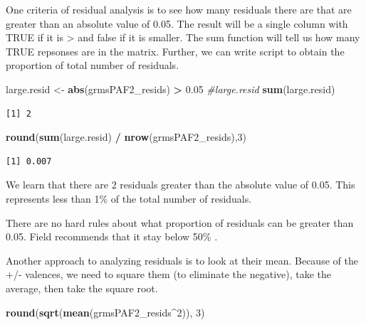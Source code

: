 \documentclass[
  english,
]{book}
\newenvironment{Shaded}{\begin{snugshade}}{\end{snugshade}}
\newcommand{\CommentTok}[1]{\textcolor[rgb]{0.56,0.35,0.01}{\textit{#1}}}
\newcommand{\DecValTok}[1]{\textcolor[rgb]{0.00,0.00,0.81}{#1}}
\newcommand{\FloatTok}[1]{\textcolor[rgb]{0.00,0.00,0.81}{#1}}
\newcommand{\KeywordTok}[1]{\textcolor[rgb]{0.13,0.29,0.53}{\textbf{#1}}}
\newcommand{\NormalTok}[1]{#1}
\newcommand{\OperatorTok}[1]{\textcolor[rgb]{0.81,0.36,0.00}{\textbf{#1}}}
\newcommand{\StringTok}[1]{\textcolor[rgb]{0.31,0.60,0.02}{#1}}
\begin{document}
One criteria of residual analysis is to see how many residuals there are that are greater than an absolute value of 0.05. The result will be a single column with TRUE if it is \textgreater{} \textbar{} and false if it is smaller. The sum function will tell us how many TRUE repsonses are in the matrix. Further, we can write script to obtain the proportion of total number of residuals.

\begin{Shaded}
\begin{Highlighting}[]
\NormalTok{large.resid <-}\StringTok{ }\KeywordTok{abs}\NormalTok{(grmsPAF2_resids) }\OperatorTok{>}\StringTok{ }\FloatTok{0.05}
\CommentTok{#large.resid}
\KeywordTok{sum}\NormalTok{(large.resid)}
\end{Highlighting}
\end{Shaded}

\begin{verbatim}
[1] 2
\end{verbatim}

\begin{Shaded}
\begin{Highlighting}[]
\KeywordTok{round}\NormalTok{(}\KeywordTok{sum}\NormalTok{(large.resid) }\OperatorTok{/}\StringTok{ }\KeywordTok{nrow}\NormalTok{(grmsPAF2_resids),}\DecValTok{3}\NormalTok{)}
\end{Highlighting}
\end{Shaded}

\begin{verbatim}
[1] 0.007
\end{verbatim}

We learn that there are 2 residuals greater than the absolute value of 0.05. This represents less than 1\% of the total number of residuals.

There are no hard rules about what proportion of residuals can be greater than 0.05. Field recommends that it stay below 50\% \citep{field_discovering_2012}.

Another approach to analyzing residuals is to look at their mean. Because of the +/- valences, we need to square them (to eliminate the negative), take the average, then take the square root.

\begin{Shaded}
\begin{Highlighting}[]
\KeywordTok{round}\NormalTok{(}\KeywordTok{sqrt}\NormalTok{(}\KeywordTok{mean}\NormalTok{(grmsPAF2_resids}\OperatorTok{^}\DecValTok{2}\NormalTok{)), }\DecValTok{3}\NormalTok{)}
\end{Highlighting}
\end{Shaded}
\end{document}
